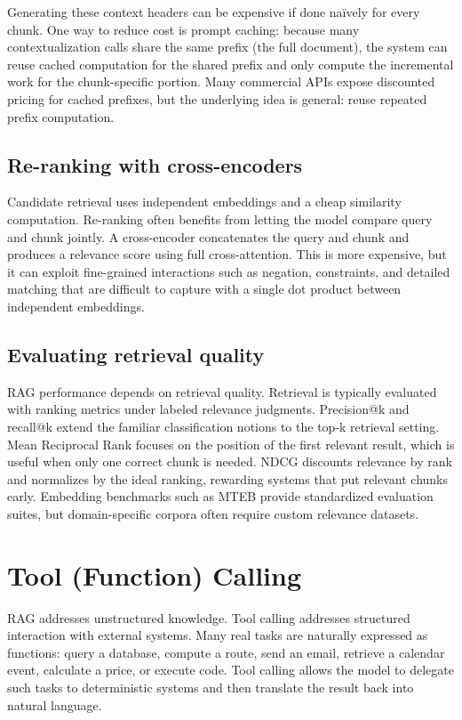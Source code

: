 Generating these context headers can be expensive if done naïvely for every chunk. One way to reduce cost is prompt caching: because many contextualization calls share the same prefix (the full document), the system can reuse cached computation for the shared prefix and only compute the incremental work for the chunk-specific portion. Many commercial APIs expose discounted pricing for cached prefixes, but the underlying idea is general: reuse repeated prefix computation.

\subsection{Re-ranking with cross-encoders}
Candidate retrieval uses independent embeddings and a cheap similarity computation. Re-ranking often benefits from letting the model compare query and chunk jointly. A cross-encoder concatenates the query and chunk and produces a relevance score using full cross-attention. This is more expensive, but it can exploit fine-grained interactions such as negation, constraints, and detailed matching that are difficult to capture with a single dot product between independent embeddings.

\subsection{Evaluating retrieval quality}
RAG performance depends on retrieval quality. Retrieval is typically evaluated with ranking metrics under labeled relevance judgments. Precision@k and recall@k extend the familiar classification notions to the top-k retrieval setting. Mean Reciprocal Rank focuses on the position of the first relevant result, which is useful when only one correct chunk is needed. NDCG discounts relevance by rank and normalizes by the ideal ranking, rewarding systems that put relevant chunks early. Embedding benchmarks such as MTEB provide standardized evaluation suites, but domain-specific corpora often require custom relevance datasets.

\section{Tool (Function) Calling}
RAG addresses unstructured knowledge. Tool calling addresses structured interaction with external systems. Many real tasks are naturally expressed as functions: query a database, compute a route, send an email, retrieve a calendar event, calculate a price, or execute code. Tool calling allows the model to delegate such tasks to deterministic systems and then translate the result back into natural language.

